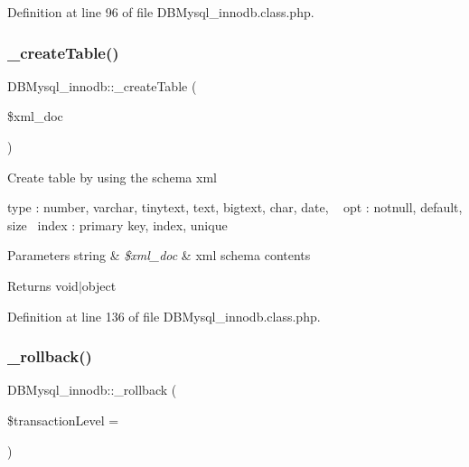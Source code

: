 Definition at line 96 of file D\+B\+Mysql\+\_\+innodb.\+class.\+php.

\mbox{\label{classDBMysql__innodb_aa2b634992fbfaaadea5c897b8810b87c}} 
\subsubsection{\texorpdfstring{\+\_\+create\+Table()}{\_createTable()}}
{\footnotesize\ttfamily D\+B\+Mysql\+\_\+innodb\+::\+\_\+create\+Table (\begin{DoxyParamCaption}\item[{}]{\$xml\+\_\+doc }\end{DoxyParamCaption})}

Create table by using the schema xml

type \+: number, varchar, tinytext, text, bigtext, char, date, ~\newline
opt \+: notnull, default, size~\newline
index \+: primary key, index, unique~\newline

\begin{DoxyParams}[1]{Parameters}
string & {\em \$xml\+\_\+doc} & xml schema contents \\
\hline
\end{DoxyParams}
\begin{DoxyReturn}{Returns}
void$\vert$object 
\end{DoxyReturn}


Definition at line 136 of file D\+B\+Mysql\+\_\+innodb.\+class.\+php.

\mbox{\label{classDBMysql__innodb_a36779df768253f967560eee5a8c1ae89}} 
\subsubsection{\texorpdfstring{\+\_\+rollback()}{\_rollback()}}
{\footnotesize\ttfamily D\+B\+Mysql\+\_\+innodb\+::\+\_\+rollback (\begin{DoxyParamCaption}\item[{}]{\$transaction\+Level = {} }\end{DoxyParamCaption})}

